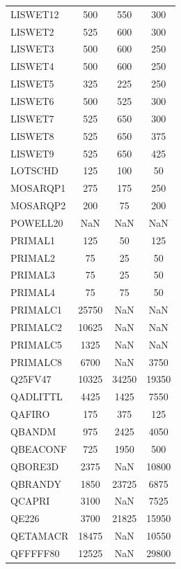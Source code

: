 \begin{longtable}{lccc}
LISWET12 &      500 &   550 &      300 \\
LISWET2  &      525 &   600 &      300 \\
LISWET3  &      500 &   600 &      250 \\
LISWET4  &      500 &   600 &      250 \\
LISWET5  &      325 &   225 &      250 \\
LISWET6  &      500 &   525 &      300 \\
LISWET7  &      525 &   650 &      300 \\
LISWET8  &      525 &   650 &      375 \\
LISWET9  &      525 &   650 &      425 \\
LOTSCHD  &      125 &   100 &       50 \\
MOSARQP1 &      275 &   175 &      250 \\
MOSARQP2 &      200 &    75 &      200 \\
POWELL20 &      NaN &   NaN &      NaN \\
PRIMAL1  &      125 &    50 &      125 \\
PRIMAL2  &       75 &    25 &       50 \\
PRIMAL3  &       75 &    25 &       50 \\
PRIMAL4  &       75 &    75 &       50 \\
PRIMALC1 &    25750 &   NaN &      NaN \\
PRIMALC2 &    10625 &   NaN &      NaN \\
PRIMALC5 &     1325 &   NaN &      NaN \\
PRIMALC8 &     6700 &   NaN &     3750 \\
Q25FV47  &    10325 & 34250 &    19350 \\
QADLITTL &     4425 &  1425 &     7550 \\
QAFIRO   &      175 &   375 &      125 \\
QBANDM   &      975 &  2425 &     4050 \\
QBEACONF &      725 &  1950 &      500 \\
QBORE3D  &     2375 &   NaN &    10800 \\
QBRANDY  &     1850 & 23725 &     6875 \\
QCAPRI   &     3100 &   NaN &     7525 \\
QE226    &     3700 & 21825 &    15950 \\
QETAMACR &    18475 &   NaN &    10550 \\
QFFFFF80 &    12525 &   NaN &    29800 \\

\end{longtable}
